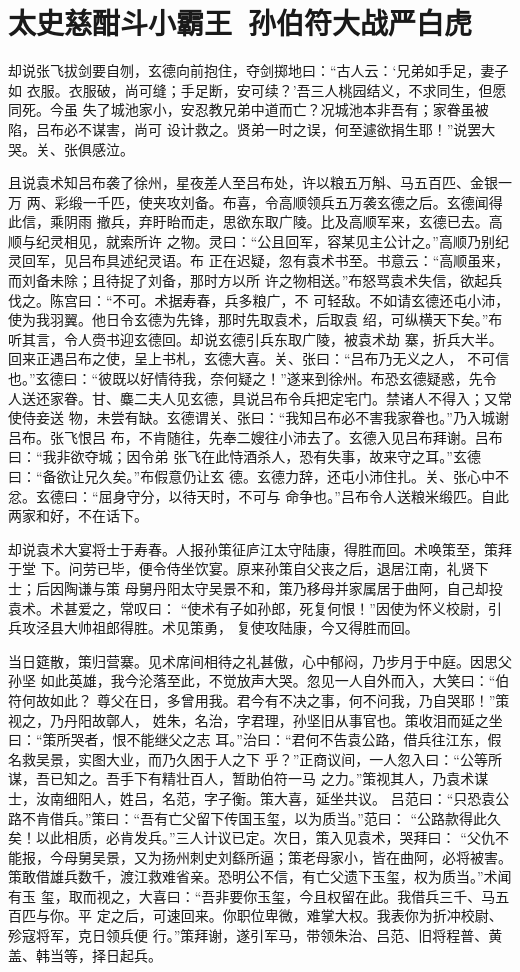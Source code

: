 \chapter{太史慈酣斗小霸王~孙伯符大战严白虎}

却说张飞拔剑要自刎，玄德向前抱住，夺剑掷地曰：“古人云：‘兄弟如手足，妻子如
衣服。衣服破，尚可缝；手足断，安可续？’吾三人桃园结义，不求同生，但愿同死。今虽
失了城池家小，安忍教兄弟中道而亡？况城池本非吾有；家眷虽被陷，吕布必不谋害，尚可
设计救之。贤弟一时之误，何至遽欲捐生耶！”说罢大哭。关、张俱感泣。

且说袁术知吕布袭了徐州，星夜差人至吕布处，许以粮五万斛、马五百匹、金银一万
两、彩缎一千匹，使夹攻刘备。布喜，令高顺领兵五万袭玄德之后。玄德闻得此信，乘阴雨
撤兵，弃盱眙而走，思欲东取广陵。比及高顺军来，玄德已去。高顺与纪灵相见，就索所许
之物。灵曰：“公且回军，容某见主公计之。”高顺乃别纪灵回军，见吕布具述纪灵语。布
正在迟疑，忽有袁术书至。书意云：“高顺虽来，而刘备未除；且待捉了刘备，那时方以所
许之物相送。”布怒骂袁术失信，欲起兵伐之。陈宫曰：“不可。术据寿春，兵多粮广，不
可轻敌。不如请玄德还屯小沛，使为我羽翼。他日令玄德为先锋，那时先取袁术，后取袁
绍，可纵横天下矣。”布听其言，令人赍书迎玄德回。却说玄德引兵东取广陵，被袁术劫
寨，折兵大半。回来正遇吕布之使，呈上书札，玄德大喜。关、张曰：“吕布乃无义之人，
不可信也。”玄德曰：“彼既以好情待我，奈何疑之！”遂来到徐州。布恐玄德疑惑，先令
人送还家眷。甘、麋二夫人见玄德，具说吕布令兵把定宅门。禁诸人不得入；又常使侍妾送
物，未尝有缺。玄德谓关、张曰：“我知吕布必不害我家眷也。”乃入城谢吕布。张飞恨吕
布，不肯随往，先奉二嫂往小沛去了。玄德入见吕布拜谢。吕布曰：“我非欲夺城；因令弟
张飞在此恃酒杀人，恐有失事，故来守之耳。”玄德曰：“备欲让兄久矣。”布假意仍让玄
德。玄德力辞，还屯小沛住扎。关、张心中不忿。玄德曰：“屈身守分，以待天时，不可与
命争也。”吕布令人送粮米缎匹。自此两家和好，不在话下。

却说袁术大宴将士于寿春。人报孙策征庐江太守陆康，得胜而回。术唤策至，策拜于堂
下。问劳已毕，便令侍坐饮宴。原来孙策自父丧之后，退居江南，礼贤下士；后因陶谦与策
母舅丹阳太守吴景不和，策乃移母并家属居于曲阿，自己却投袁术。术甚爱之，常叹曰：
“使术有子如孙郎，死复何恨！”因使为怀义校尉，引兵攻泾县大帅祖郎得胜。术见策勇，
复使攻陆康，今又得胜而回。

当日筵散，策归营寨。见术席间相待之礼甚傲，心中郁闷，乃步月于中庭。因思父孙坚
如此英雄，我今沦落至此，不觉放声大哭。忽见一人自外而入，大笑曰：“伯符何故如此？
尊父在日，多曾用我。君今有不决之事，何不问我，乃自哭耶！”策视之，乃丹阳故鄣人，
姓朱，名治，字君理，孙坚旧从事官也。策收泪而延之坐曰：“策所哭者，恨不能继父之志
耳。”治曰：“君何不告袁公路，借兵往江东，假名救吴景，实图大业，而乃久困于人之下
乎？”正商议间，一人忽入曰：“公等所谋，吾已知之。吾手下有精壮百人，暂助伯符一马
之力。”策视其人，乃袁术谋士，汝南细阳人，姓吕，名范，字子衡。策大喜，延坐共议。
吕范曰：“只恐袁公路不肯借兵。”策曰：“吾有亡父留下传国玉玺，以为质当。”范曰：
“公路款得此久矣！以此相质，必肯发兵。”三人计议已定。次日，策入见袁术，哭拜曰：
“父仇不能报，今母舅吴景，又为扬州刺史刘繇所逼；策老母家小，皆在曲阿，必将被害。
策敢借雄兵数千，渡江救难省亲。恐明公不信，有亡父遗下玉玺，权为质当。”术闻有玉
玺，取而视之，大喜曰：“吾非要你玉玺，今且权留在此。我借兵三千、马五百匹与你。平
定之后，可速回来。你职位卑微，难掌大权。我表你为折冲校尉、殄寇将军，克日领兵便
行。”策拜谢，遂引军马，带领朱治、吕范、旧将程普、黄盖、韩当等，择日起兵。

